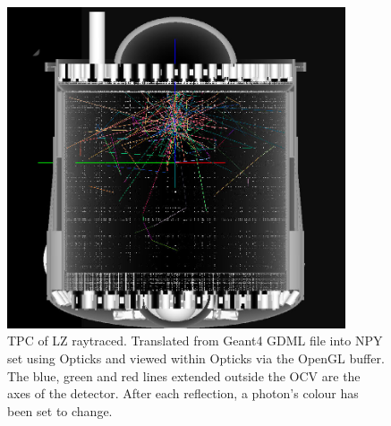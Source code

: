 \begin{figure}
\includegraphics[width=10cm]{Figures/Simulations/LZ_S1_photons_In_Opticks.png}
\centering
\caption{TPC of LZ raytraced. Translated from Geant4 GDML file into NPY set using Opticks and viewed within Opticks via the OpenGL buffer.
The blue, green and red lines extended outside the OCV are the axes of the detector. After each reflection, a photon's colour has been set to change.}
\label{fig:OpticksLZTPC_S1_Photons}
\end{figure}